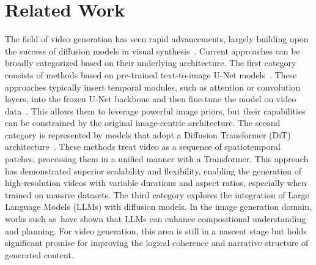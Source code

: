\section{Related Work}\label{sec:related}

 The field of video generation has seen rapid advancements, largely building upon the success of diffusion models in visual synthesis~\cite{ho2020denoising, song2020denoising}. Current approaches can be broadly categorized based on their underlying architecture.
The first category consists of methods based on pre-trained text-to-image U-Net models~\cite{esser2024scaling, chen2024pixart}. These approaches typically insert temporal modules, such as attention or convolution layers, into the frozen U-Net backbone and then fine-tune the model on video data~\cite{guo2023animatediff, wang2023modelscope}. This allows them to leverage powerful image priors, but their capabilities can be constrained by the original image-centric architecture.
The second category is represented by models that adopt a Diffusion Transformer (DiT) architecture~\cite{brooks2024video, yang2024cogvideox, zheng2024open, kong2024hunyuanvideo, ma2025step, polyak2024movie,chen2024gentron,menapace2024snap}. These methods treat video as a sequence of spatiotemporal patches, processing them in a unified manner with a Transformer. This approach has demonstrated superior scalability and flexibility, enabling the generation of high-resolution videos with variable durations and aspect ratios, especially when trained on massive datasets.
The third category explores the integration of Large Language Models (LLMs) with diffusion models. In the image generation domain, works such as~\cite{yu2023scaling, koh2023generating,pan2025transfer,wu2025qwen,wu2024next,shi2024lmfusion}have shown that LLMs can enhance compositional understanding and planning. For video generation, this area is still in a nascent stage but holds significant promise for improving the logical coherence and narrative structure of generated content.

